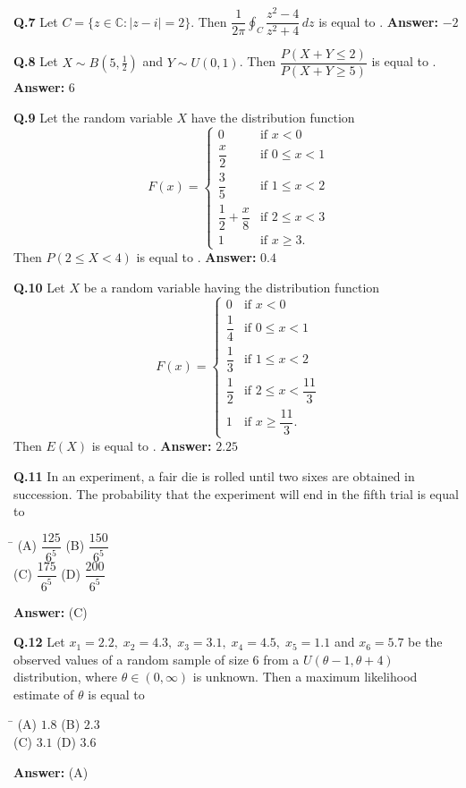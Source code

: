 \documentclass[11pt,a4paper]{article}
\newcommand{\optsfourA}[4]{%
  \begin{tabbing}
    \hspace{0.48\linewidth}\=\kill
    (A) #1 \> (B) #2 \\[2pt]
    (C) #3 \> (D) #4
  \end{tabbing}%
}
\newcommand{\ans}[1]{\textbf{Answer:} #1\par\medskip}
\begin{document}
\textbf{Q.7} Let $C = \{z \in \mathbb{C} : |z - i| = 2\}$. Then $\dfrac{1}{2\pi} \displaystyle\oint_C \dfrac{z^2 - 4}{z^2 + 4}\,dz$ is equal to \underline{\hspace{2cm}}.
\ans{$-2$}

\textbf{Q.8} Let $X \sim B\!\left(5, \frac{1}{2}\right)$ and $Y \sim U(0, 1)$. Then $\dfrac{P(X + Y \le 2)}{P(X + Y \ge 5)}$ is equal to \underline{\hspace{2cm}}.
\ans{$6$}

\textbf{Q.9} Let the random variable $X$ have the distribution function
\[
  F(x) = \begin{cases}
    0 & \text{if } x < 0 \\[2pt]
    \dfrac{x}{2} & \text{if } 0 \le x < 1 \\[6pt]
    \dfrac{3}{5} & \text{if } 1 \le x < 2 \\[6pt]
    \dfrac{1}{2} + \dfrac{x}{8} & \text{if } 2 \le x < 3 \\[6pt]
    1 & \text{if } x \ge 3.
  \end{cases}
\]
Then $P(2 \le X < 4)$ is equal to \underline{\hspace{2cm}}.
\ans{$0.4$}

\textbf{Q.10} Let $X$ be a random variable having the distribution function
\[
  F(x) = \begin{cases}
    0 & \text{if } x < 0 \\[2pt]
    \dfrac{1}{4} & \text{if } 0 \le x < 1 \\[6pt]
    \dfrac{1}{3} & \text{if } 1 \le x < 2 \\[6pt]
    \dfrac{1}{2} & \text{if } 2 \le x < \dfrac{11}{3} \\[6pt]
    1 & \text{if } x \ge \dfrac{11}{3}.
  \end{cases}
\]
Then $E(X)$ is equal to \underline{\hspace{2cm}}.
\ans{$2.25$}

\textbf{Q.11} In an experiment, a fair die is rolled until two sixes are obtained in succession. The probability that the experiment will end in the fifth trial is equal to
\optsfourA{$\dfrac{125}{6^5}$}{$\dfrac{150}{6^5}$}{$\dfrac{175}{6^5}$}{$\dfrac{200}{6^5}$}
\ans{(C)}

\textbf{Q.12} Let $x_1 = 2.2,\; x_2 = 4.3,\; x_3 = 3.1,\; x_4 = 4.5,\; x_5 = 1.1$ and $x_6 = 5.7$ be the observed values of a random sample of size $6$ from a $U(\theta - 1, \theta + 4)$ distribution, where $\theta \in (0, \infty)$ is unknown. Then a maximum likelihood estimate of $\theta$ is equal to
\optsfourA{$1.8$}{$2.3$}{$3.1$}{$3.6$}
\ans{(A)}
\end{document}
